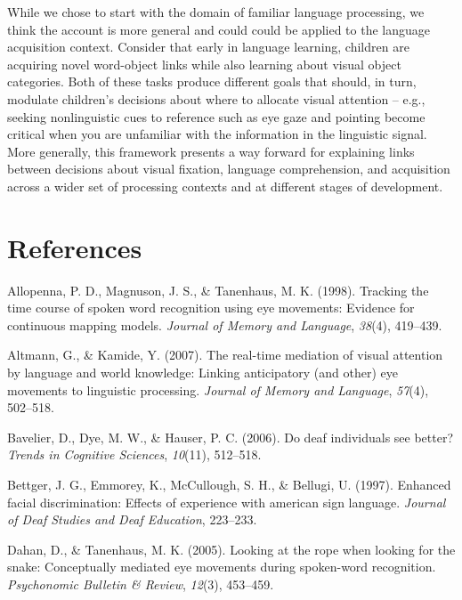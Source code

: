 \documentclass[english,floatsintext,man]{apa6}
\begin{document}
While we chose to start with the domain of familiar language processing,
we think the account is more general and could could be applied to the
language acquisition context. Consider that early in language learning,
children are acquiring novel word-object links while also learning about
visual object categories. Both of these tasks produce different goals
that should, in turn, modulate children's decisions about where to
allocate visual attention -- e.g., seeking nonlinguistic cues to
reference such as eye gaze and pointing become critical when you are
unfamiliar with the information in the linguistic signal. More
generally, this framework presents a way forward for explaining links
between decisions about visual fixation, language comprehension, and
acquisition across a wider set of processing contexts and at different
stages of development.

\newpage

\hypertarget{references}{%
\section{References}\label{references}}

\setlength{\parindent}{-0.5in}
\setlength{\leftskip}{0.5in}

\hypertarget{refs}{}
\leavevmode\hypertarget{ref-allopenna1998tracking}{}%
Allopenna, P. D., Magnuson, J. S., \& Tanenhaus, M. K. (1998). Tracking
the time course of spoken word recognition using eye movements: Evidence
for continuous mapping models. \emph{Journal of Memory and Language},
\emph{38}(4), 419--439.

\leavevmode\hypertarget{ref-altmann2007real}{}%
Altmann, G., \& Kamide, Y. (2007). The real-time mediation of visual
attention by language and world knowledge: Linking anticipatory (and
other) eye movements to linguistic processing. \emph{Journal of Memory
and Language}, \emph{57}(4), 502--518.

\leavevmode\hypertarget{ref-bavelier2006deaf}{}%
Bavelier, D., Dye, M. W., \& Hauser, P. C. (2006). Do deaf individuals
see better? \emph{Trends in Cognitive Sciences}, \emph{10}(11),
512--518.

\leavevmode\hypertarget{ref-bettger1997enhanced}{}%
Bettger, J. G., Emmorey, K., McCullough, S. H., \& Bellugi, U. (1997).
Enhanced facial discrimination: Effects of experience with american sign
language. \emph{Journal of Deaf Studies and Deaf Education}, 223--233.

\leavevmode\hypertarget{ref-dahan2005looking}{}%
Dahan, D., \& Tanenhaus, M. K. (2005). Looking at the rope when looking
for the snake: Conceptually mediated eye movements during spoken-word
recognition. \emph{Psychonomic Bulletin \& Review}, \emph{12}(3),
453--459.
\end{document}
